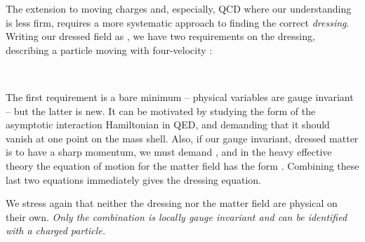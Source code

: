 \documentclass[12pt,a4paper]{article}
\begin{document}
The extension to moving charges and, especially, QCD where our understanding is less firm, requires a more
systematic approach to finding the correct \emph{dressing}. Writing our dressed field as \coordHE{},
we have two requirements\cite{Bagan:1998kg}
on the dressing, \coordHE{} describing a particle moving with four-velocity \coordHE{}:\\[2mm]
\begin{center}
\begin{minipage}{.97\linewidth}\begin{center}\end{center}
\end{minipage}\\[3mm]\end{center}
The first requirement is a bare minimum -- physical variables are gauge invariant -- but the latter
is new. It can be motivated  by studying the form of the asymptotic interaction Hamiltonian
in QED, and demanding that it should vanish at one point on the mass shell.
Also, if our gauge invariant, dressed matter is to have a sharp momentum, we must demand
\coordHE{}, and in the heavy effective
theory the equation of motion for the matter field has the form \coordHE{}. Combining
these last two equations immediately gives the dressing equation.

We stress again that neither the dressing nor the matter field are physical on their own. \emph{Only
the combination \coordHE{} is locally gauge invariant and can be identified with a charged particle.}
\end{document}
